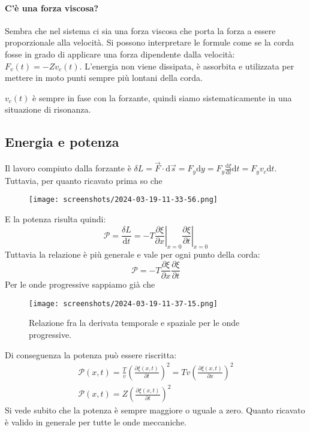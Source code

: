 \paragraph{C'è una forza viscosa?}

Sembra che nel sistema ci sia una forza viscosa che porta la forza a essere proporzionale alla velocità. Si possono interpretare le formule come se la corda fosse in grado di applicare una forza dipendente dalla velocità: \(F_v(t) = -Z v_c(t)\). L'energia non viene dissipata, è assorbita e utilizzata per mettere in moto punti sempre più lontani della corda.

\begin{note}
	\(v_c(t)\) è sempre in fase con la forzante, quindi siamo sistematicamente in una situazione di risonanza.
\end{note}

\subsection{Energia e potenza}

Il lavoro compiuto dalla forzante è \(\delta L = \vec{F} \cdot \mathrm{d} \vec{s} = F_y \mathrm{d} y = F_y \frac{\mathrm{d}\xi }{\mathrm{d}t} \mathrm{d} t = F_y v_c \mathrm{d} t \). Tuttavia, per quanto ricavato prima so che

\begin{figure}[H]
	\centering
	\texttt{[image: screenshots/2024-03-19-11-33-56.png]}
\end{figure}

E la potenza risulta quindi:
\[
	\mathcal{P} = \frac{\delta L}{\mathrm{d} t} = -T \left. \frac{\partial \xi }{\partial x} \right\vert_{x=0} \left. \frac{\partial \xi}{\partial t}\right\vert_{x=0} 
\]
Tuttavia la relazione è più generale e vale per ogni punto della corda:
\[
	\mathcal{P} = -T \frac{\partial \xi }{\partial x} \frac{\partial \xi }{\partial t}
\]
Per le onde progressive sappiamo già che 
\begin{figure}[H]
	\centering
	\texttt{[image: screenshots/2024-03-19-11-37-15.png]}
	\caption{Relazione fra la derivata temporale e spaziale per le onde progressive.}
	\label{fig:dt-dx-onda-prog}
\end{figure}
Di conseguenza la potenza può essere riscritta:
\begin{gather*}
	\mathcal{P} (x,t) = \frac{T}{v}\left(\frac{\partial \xi (x,t)}{\partial t}\right)^{2}  = Tv\left(\frac{\partial \xi (x,t)}{\partial x} \right)^{2} \\
	\mathcal{P} (x,t) = Z \left(\frac{\partial \xi (x,t)}{\partial t}\right)^{2}
\end{gather*}
Si vede subito che la potenza è sempre maggiore o uguale a zero. Quanto ricavato è valido in generale per tutte le onde meccaniche.

